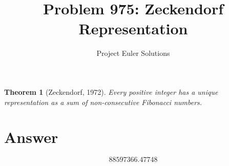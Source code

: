 \documentclass[11pt]{article}
\title{Problem 975: Zeckendorf Representation}
\author{Project Euler Solutions}
\date{}
\newtheorem{theorem}{Theorem}
\begin{document}
\maketitle
\begin{theorem}[Zeckendorf, 1972]
Every positive integer has a unique representation as a sum of non-consecutive Fibonacci numbers.
\end{theorem}
\section{Answer}

\[
\boxed{88597366.47748}
\]
\end{document}
